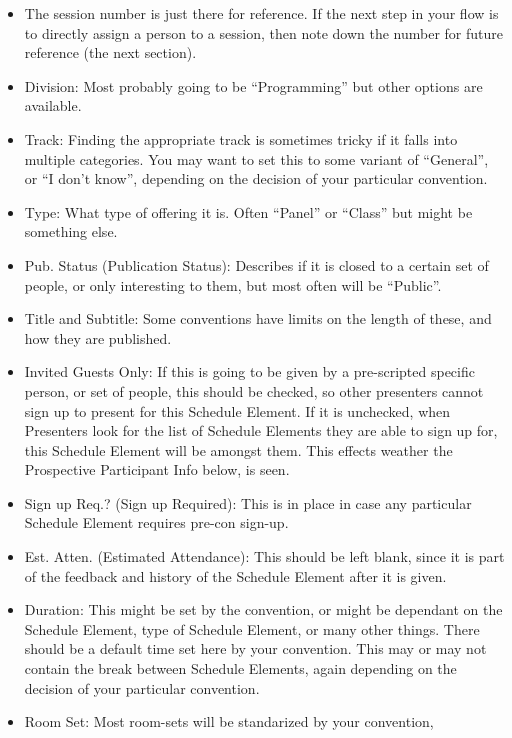 \documentclass[tablesignature]{scrartcl}
\begin{document}
\begin{itemize}
\item The session number is just there for reference.  If the next step
     in your flow is to directly assign a person to a session, then
     note down the number for future reference (the next section).
\item Division: Most probably going to be ``Programming'' but other
     options are available.
\item Track: Finding the appropriate track is sometimes tricky if it
     falls into multiple categories.  You may want to set this to
     some variant of ``General'', or ``I don't know'', depending on the
     decision of your particular convention.
\item Type: What type of offering it is.  Often ``Panel'' or ``Class'' but
     might be something else.
\item Pub. Status (Publication Status): Describes if it is closed to a
     certain set of people, or only interesting to them, but most
     often will be ``Public''.
\item Title and Subtitle: Some conventions have limits on the length of
     these, and how they are published.
\item Invited Guests Only: If this is going to be given by a
     pre-scripted specific person, or set of people, this should be
     checked, so other presenters cannot sign up to present for this
     Schedule Element.  If it is unchecked, when Presenters look for
     the list of Schedule Elements they are able to sign up for, this
     Schedule Element will be amongst them.  This effects weather the
     Prospective Participant Info below, is seen.
\item Sign up Req.? (Sign up Required): This is in place in case any
     particular Schedule Element requires pre-con sign-up.
\item Est. Atten. (Estimated Attendance): This should be left blank,
     since it is part of the feedback and history of the Schedule
     Element after it is given.
\item Duration: This might be set by the convention, or might be
     dependant on the Schedule Element, type of Schedule Element, or
     many other things.  There should be a default time set here by
     your convention.  This may or may not contain the break
     between Schedule Elements, again depending on the decision of
     your particular convention.
\item Room Set: Most room-sets will be standarized by your convention,

\end{itemize}
\end{document}
